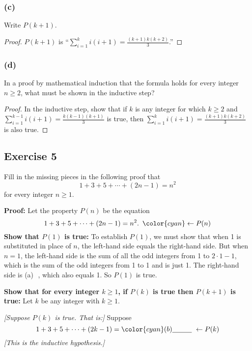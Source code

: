 \documentclass[14pt]{extarticle}
\newcommand{\dps}{\displaystyle}
\newcommand{\fbl}{\underline{\hspace{1cm}}\,\,}
\newcommand{\from}{\leftarrow}
\newcommand{\cy}{\color{cyan}}
\begin{document}
\subsubsection{(c)}
Write $P(k + 1)$.

\begin{proof}
    $P(k+1)$ is ``$\dps \sum_{i=1}^{k}i(i+1) = \frac{(k+1)k(k+2)}{3}$.''
\end{proof}

\subsubsection{(d)}
In a proof by mathematical induction that the formula holds for every integer $n \geq 2$, what must be shown in the inductive step?

\begin{proof}
    In the inductive step, show that if $k$ is any integer for which $k \geq 2$ and \\ $\dps \sum_{i=1}^{k-1}i(i+1) = \frac{k(k-1)(k+1)}{3}$ is true, then $\dps \sum_{i=1}^{k}i(i+1) = \frac{(k+1)k(k+2)}{3}$ is also true.
\end{proof}

\subsection{Exercise 5}
Fill in the missing pieces in the following proof that
\[
    1 + 3 + 5 + \cdots + (2n - 1) = n^2
\]
for every integer $n \geq 1$.

    {\bf Proof:} Let the property $P(n)$ be the equation
\[
    1 + 3 + 5 + \cdots + (2n - 1) = n^2. \,\,\,{\cy \from P(n)}
\]
{\bf Show that $P(1)$ is true:} To establish $P(1)$, we must show that when 1 is substituted in place of $n$, the left-hand side equals the right-hand side. But when $n = 1$, the left-hand side is the sum of all the odd integers from 1 to $2\cdot 1 - 1$, which is the sum of the odd integers from 1 to 1 and is just 1. The right-hand side is {\cy (a) \fbl}, which also equals 1. So $P(1)$ is true.

    {\bf Show that for every integer $k \geq 1$, if $P(k)$ is true then $P(k+1)$ is true:} Let $k$ be any integer with $k \geq 1$.

    {\it [Suppose $P(k)$ is true. That is:]} Suppose
\[
    1 + 3 + 5 + \cdots + (2k - 1) = {\cy (b) \fbl \from P(k)}
\]
{\it [This is the inductive hypothesis.]}
\end{document}
